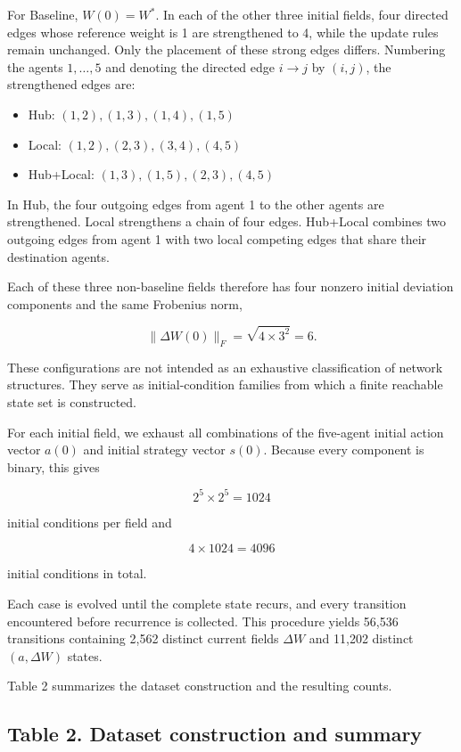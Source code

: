 \documentclass[
  11pt,
]{article}
\providecommand{\tightlist}{%
  \setlength{\itemsep}{0pt}\setlength{\parskip}{0pt}}
\begin{document}
For Baseline, \({W(0)=W^\ast}\). In each of the other three initial
fields, four directed edges whose reference weight is 1 are strengthened
to 4, while the update rules remain unchanged. Only the placement of
these strong edges differs. Numbering the agents \({1,\ldots,5}\) and
denoting the directed edge \({i\to j}\) by \({(i,j)}\), the strengthened
edges are:

\begin{itemize}
\tightlist
\item
  Hub: \({(1,2),(1,3),(1,4),(1,5)}\)
\item
  Local: \({(1,2),(2,3),(3,4),(4,5)}\)
\item
  Hub+Local: \({(1,3),(1,5),(2,3),(4,5)}\)
\end{itemize}

In Hub, the four outgoing edges from agent 1 to the other agents are
strengthened. Local strengthens a chain of four edges. Hub+Local
combines two outgoing edges from agent 1 with two local competing edges
that share their destination agents.

Each of these three non-baseline fields therefore has four nonzero
initial deviation components and the same Frobenius norm,

\[{\lVert\Delta W(0)\rVert_F=\sqrt{4\times3^2}=6.}\]

These configurations are not intended as an exhaustive classification of
network structures. They serve as initial-condition families from which
a finite reachable state set is constructed.

For each initial field, we exhaust all combinations of the five-agent
initial action vector \({a(0)}\) and initial strategy vector \({s(0)}\).
Because every component is binary, this gives

\[{2^5\times2^5=1024}\]

initial conditions per field and

\[{4\times1024=4096}\]

initial conditions in total.

Each case is evolved until the complete state recurs, and every
transition encountered before recurrence is collected. This procedure
yields 56,536 transitions containing 2,562 distinct current fields
\({\Delta W}\) and 11,202 distinct \({(a,\Delta W)}\) states.

Table 2 summarizes the dataset construction and the resulting counts.

\hypertarget{table-2.-dataset-construction-and-summary}{%
\subsection{Table 2. Dataset construction and
summary}\label{table-2.-dataset-construction-and-summary}}
\end{document}
